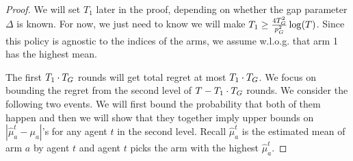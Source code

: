  






\begin{proof}
  We will set $T_1$ later in the proof, depending on whether the gap
  parameter $\Delta$ is known. For now, we just need to know we will
  make $T_1 \geq \frac{4T_G^2}{p_G^2}\log(T)$. Since this policy is
  agnostic to the indices of the arms, we assume w.l.o.g. that arm 1
  has the highest mean.

  The first $T_1 \cdot T_G$ rounds will get total regret at most
  $T_1 \cdot T_G$.  We focus on bounding the regret from the second
  level of $T - T_1 \cdot T_G$ rounds. We consider the following two
   events. We will first bound the probability that both of them
  happen and then we will show that they together imply upper bounds
  on $|\hat{\mu}^t_a - \mu_a|$'s for any agent $t$ in the second
  level. Recall $\hat{\mu}^t_a$ is the estimated mean of arm $a$ by
  agent $t$ and agent $t$ picks the arm with the highest
  $\hat{\mu}^t_a$.


\end{proof}
